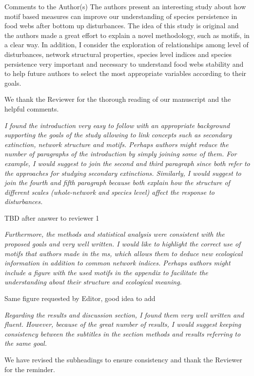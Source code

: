 \documentclass[12pt]{article}
\newcommand{\us}{\rm \setlength{\leftskip}{0.3cm} \setlength{\rightskip}{0.3cm}}
\newcommand{\them}{\it \setlength{\leftskip}{0cm} \setlength{\rightskip}{0cm}}
\begin{document}
Comments to the Author(s)
The authors present an interesting study about how motif based measures can improve our understanding of species persistence in food webs after bottom up disturbances. The idea of this study is original and the authors made a great effort to explain a novel methodology, such as motifs, in a clear way. In addition, I consider the exploration of relationships among level of disturbances, network structural properties, species level indices and species persistence very important and necessary to understand food webs stability and to help future authors to select the most appropriate variables according to their goals.

\us
We thank the Reviewer for the thorough reading of our manuscript and the helpful comments. 

\them
I found the introduction very easy to follow with an appropriate background supporting the goals of the study allowing to link concepts such as secondary extinction, network structure and motifs. Perhaps authors might reduce the number of paragraphs of the introduction by simply joining some of them. For example, I would suggest to join the second and third paragraph since both refer to the approaches for studying secondary extinctions. Similarly, I would suggest to join the fourth and fifth paragraph because both explain how the structure of different scales (whole-network and species level) affect the response to disturbances.

\us TBD after answer to reviewer 1

\them
Furthermore, the methods and statistical analysis were consistent with the proposed goals and very well written. I would like to highlight the correct use of motifs that authors made in the ms, which allows them to deduce new ecological information in addition to common network indices. Perhaps authors might include a figure with the used motifs in the appendix to facilitate the understanding about their structure and ecological meaning. 

\us Same figure requested by Editor, good idea to add

\them
Regarding the results and discussion section, I found them very well written and fluent. However, because of the great number of results, I would suggest keeping consistency between the subtitles in the section methods and results referring to the same goal.

\us We have revised the subheadings to ensure consistency and thank the Reviewer for the reminder.
\end{document}
